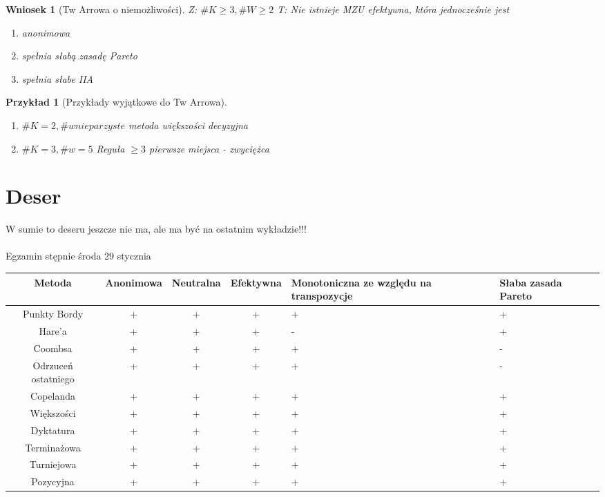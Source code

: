 \documentclass[12pt,a4paper]{article}
\theoremstyle{break}
\newtheorem{wniosek}{Wniosek}[theorem]
\newtheorem{example}{Przykład}[section]
\begin{document}
		\begin{wniosek}[Tw Arrowa o niemożliwości]
			Z: $\# K \geq 3, \#W\geq2$
			T: Nie istnieje MZU efektywna, która jednocześnie jest 
			\begin{enumerate}[-]
				\item anonimowa
				\item spełnia słabą zasadę Pareto
				\item spełnia słabe IIA
			\end{enumerate}
		\end{wniosek}
		
		\begin{example}[Przykłady wyjątkowe do Tw Arrowa]
			\begin{enumerate}[1.]
				\item  $\# K=2,\# w nieparzyste$ metoda większości decyzyjna
				\item $\# K=3,\# w = 5$ Reguła $\geq3$ pierwsze miejsca - zwyciężca
			\end{enumerate}
		\end{example}
		
	\newpage
	\section{Deser}
	W sumie to deseru jeszcze nie ma, ale ma być na ostatnim wykładzie!!! \\\\
	Egzamin stępnie środa 29 stycznia
	
	\begin{tabular}{|c|c|c|c|p{2.5cm}|p{1cm}|}\hline
		Metoda & Anonimowa & Neutralna & Efektywna & Monotoniczna ze względu na transpozycje&Słaba zasada Pareto\\\hline
		Punkty Bordy   &+&+&+&+&+\\\hline
		Hare'a   &+&+&+&-&+\\\hline
		Coombsa &+&+&+&+&-\\\hline
		Odrzuceń ostatniego &+&+&+&+&-\\\hline
		Copelanda &+&+&+&+&+\\\hline
		Większości &+&+&+&+&+\\\hline
		Dyktatura &+&+&+&+&+\\\hline
		Terminażowa &+&+&+&+&+\\\hline
		Turniejowa &+&+&+&+&+\\\hline
		Pozycyjna &+&+&+&+&+\\\hline
	\end{tabular}\\\\
	
\end{document}
